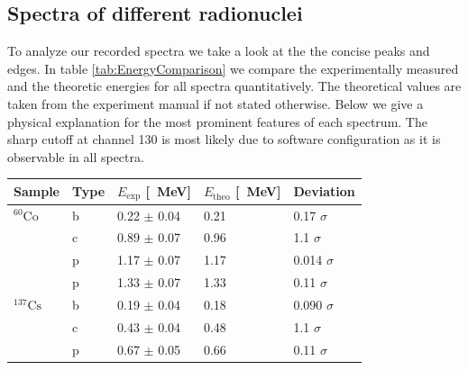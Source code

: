 \subsection{Spectra of different radionuclei}
%
To analyze our recorded spectra we take a look at the the concise peaks and edges.
In table \ref{tab:EnergyComparison} we compare the experimentally measured and the theoretic energies for all spectra quantitatively.
The theoretical values are taken from the experiment manual \cite{Anleitung} if not stated otherwise.
Below we give a physical explanation for the most prominent features of each spectrum.
The sharp cutoff at channel 130 is most likely due to software configuration as it is observable in all spectra.
%
\par
%
\begin{multicolfloat}
    \begin{center}
        \begin{adjustbox}{max width=\linewidth, keepaspectratio}
            \begin{tabular}{lllll}
            \toprule
            Sample            & Type & $E_{\text{exp}}$ [\SI{}{\mega\electronvolt}] & $E_{\text{theo}}$ [\SI{}{\mega\electronvolt}] & Deviation      \\
            \midrule
            $^{60}\text{Co}$  & b    & 0.22 $\pm$ 0.04                              & 0.21                                          & 0.17  $\sigma$ \\
            ~                 & c    & 0.89 $\pm$ 0.07                              & 0.96                                          & 1.1   $\sigma$ \\
            ~                 & p    & 1.17 $\pm$ 0.07                              & 1.17                                          & 0.014 $\sigma$ \\
            ~                 & p    & 1.33 $\pm$ 0.07                              & 1.33                                          & 0.11  $\sigma$ \\
            $^{137}\text{Cs}$ & b    & 0.19 $\pm$ 0.04                              & 0.18                                          & 0.090 $\sigma$ \\
            ~                 & c    & 0.43 $\pm$ 0.04                              & 0.48                                          & 1.1   $\sigma$ \\
            ~                 & p    & 0.67 $\pm$ 0.05                              & 0.66                                          & 0.11  $\sigma$ \\

\end{tabular}
\end{adjustbox}
\end{center}
\end{multicolfloat}
